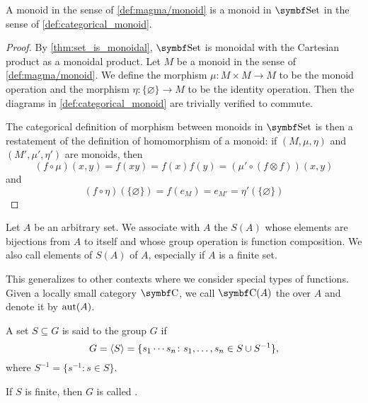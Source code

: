 \begin{proposition}\label{thm:monoids_are_monoids_in_set}
  A monoid in the sense of \cref{def:magma/monoid} is a monoid in \( \Cat{Set} \) in the sense of \cref{def:categorical_monoid}.
\end{proposition}
\begin{proof}
  By \cref{thm:set_is_monoidal}, \( \Cat{Set} \) is monoidal with the Cartesian product as a monoidal product. Let \( M \) be a monoid in the sense of \cref{def:magma/monoid}. We define the morphism \( \mu: M \times M \to M \) to be the monoid operation and the morphism \( \eta: \{ \varnothing \} \to M \) to be the identity operation. Then the diagrams in \cref{def:categorical_monoid} are trivially verified to commute.

  The categorical definition of morphism between monoids in \( \Cat{Set} \) is then a restatement of the definition of homomorphism of a monoid: if \( (M, \mu, \eta) \) and \( (M', \mu', \eta') \) are monoids, then
  \begin{equation*}
    (f \circ \mu)(x, y)
    =
    f(xy)
    =
    f(x) f(y)
    =
    (\mu' \circ (f \otimes f))(x, y)
  \end{equation*}
  and
  \begin{equation*}
    (f \circ \eta)(\{ \varnothing \})
    =
    f(e_M)
    =
    e_{M'}
    =
    \eta'(\{ \varnothing \})
  \end{equation*}
\end{proof}

\begin{definition}\label{def:symmetric_group}
  Let \( A \) be an arbitrary set. We associate with \( A \) the  \( S(A) \) whose elements are bijections from \( A \) to itself and whose group operation is function composition. We also call elements of \( S(A) \)  of \( A \), especially if \( A \) is a finite set.

  This generalizes to other contexts where we consider special types of functions. Given a locally small category \( \Cat{C} \), we call \( \Cat{C}(A) \) the  over \( A \) and denote it by \( \operatorname{aut}(A) \).
\end{definition}

\begin{definition}\label{def:group_generators}\cite[176]{Knapp2016BAlg}
  A set \( S \subseteq G \) is said to  the group \( G \) if
  \begin{equation*}
    G = \left\langle  S  \right\rangle = \{ s_1 \cdots s_n \colon s_1, \ldots, s_n \in S \cup S^{-1} \},
  \end{equation*}
  where \( S^{-1} = \{ s^{-1} \colon s \in S \} \).

  If \( S \) is finite, then \( G \) is called .
\end{definition}


